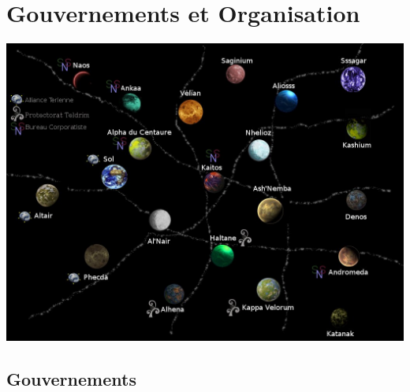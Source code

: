 \part{Gouvernements et Organisation}

\begin{center}
	\includegraphics[scale=0.45]{Img/new_carte}
\end{center}

\chapter{Gouvernements}

